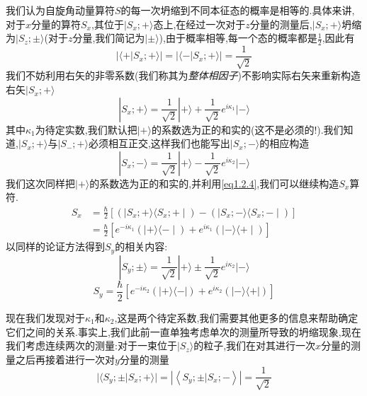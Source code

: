 \documentclass[lang=cn,newtx,10pt,scheme=chinese,thmcnt=section]{elegantbook}
\begin{document}
我们认为自旋角动量算符$S$的每一次坍缩到不同本征态的概率是相等的.具体来讲,对于$x$分量的算符$S_x$,其位于$|S_x;+\rangle$态上,在经过一次对于$z$分量的测量后,$|S_x;+\rangle$坍缩为$|S_z;\pm\rangle$(对于$z$分量,我们简记为$|\pm\rangle$),由于概率相等,每一个态的概率都是$\frac12$,因此有
\begin{equation}
	|\langle+| S_x ; +\rangle|=|\langle-| S_x ; +\rangle|=\frac{1}{\sqrt{2}}
\end{equation}
我们不妨利用右矢的非零系数(我们称其为\textit{整体相因子})不影响实际右矢来重新构造右矢$|S_x;+\rangle$
\begin{equation}
	|S_x;+\rangle=\frac{1}{\sqrt{2}}|+\rangle+\frac{1}{\sqrt{2}}e^{i\kappa_1} |-\rangle 
\end{equation}
其中$\kappa_1$为待定实数,我们默认把$|+\rangle$的系数选为正的和实的(这不是必须的!).我们知道,$|S_x;+\rangle$与$|S_-;+\rangle$必须相互正交,这样我们也能写出$|S_x;-\rangle$的相应构造
\begin{equation}
	|S_x;-\rangle=\frac{1}{\sqrt{2}}|+\rangle-\frac{1}{\sqrt{2}}e^{i\kappa_2} |-\rangle 
\end{equation}
我们这次同样把$|+\rangle$的系数选为正的和实的,并利用\ref{eq1.2.4},我们可以继续构造$S_x$算符.
\begin{equation}
	\begin{aligned}S_{x}&=\frac{\hbar}{2}[(\mid S_{x} ; +\rangle\langle S_{x} ; +\mid)-(\mid S_{x} ; -\rangle\langle S_{x} ; -\mid) ]\\&=\frac{\hbar}{2}[e^{-i\kappa_{1}}\left(\mid+\rangle\langle-\mid\right)+e^{i\kappa_{1}}\left(\mid-\rangle\langle+\mid\right)]\end{aligned}
\end{equation}
以同样的论证方法得到$S_y$的相关内容:
\begin{equation}
	|S_{y};\pm\rangle=\frac{1}{\sqrt{2}}|+\rangle\pm\frac{1}{\sqrt{2}}e^{i\kappa_{2}} |-\rangle
\end{equation}
\begin{equation}
	S_{y}=\frac{\hbar}{2}[e^{-i\kappa_{2}}(|+\rangle\langle-|)+e^{i\kappa_{2}}(|-\rangle\langle+|)]
\end{equation}

现在我们发现对于$\kappa_1$和$\kappa_2$,这是两个待定系数,我们需要其他更多的信息来帮助确定它们之间的关系.事实上,我们此前一直单独考虑单次的测量所导致的坍缩现象,现在我们考虑连续两次的测量:对于一束位于$|S_z\rangle$的粒子,我们在对其进行一次$x$分量的测量之后再接着进行一次对$y$分量的测量
\begin{equation}
	| \langle {{S}_{y}; \pm \left| {{S}_{x}; + }\rangle\right| = \left| \left\langle {{S}_{y}; \pm }|{S}_{x}; - \right\rangle \right| }= \frac{1}{\sqrt{2}}
\end{equation}
\end{document}
